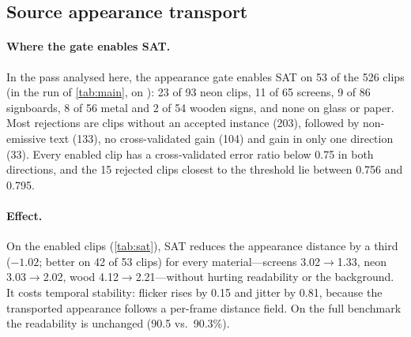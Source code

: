 \subsection{Source appearance transport}
\label{sec:exp_sat}



\paragraph{Where the gate enables SAT.} In the pass analysed here, the appearance gate enables SAT on 53 of the 526 clips (in the run of \cref{tab:main}, on \rSatOn): 23 of 93 neon clips, 11 of 65 screens, 9 of 86 signboards, 8 of 56 metal and 2 of 54 wooden signs, and none on glass or paper. Most rejections are clips without an accepted instance (203), followed by non-emissive text (133), no cross-validated gain (104) and gain in only one direction (33). Every enabled clip has a cross-validated error ratio below 0.75 in both directions, and the 15 rejected clips closest to the threshold lie between 0.756 and 0.795.

\paragraph{Effect.} On the enabled clips (\cref{tab:sat}), SAT reduces the appearance distance by a third ($-1.02$; better on 42 of 53 clips) for every material---screens 3.02$\to$1.33, neon 3.03$\to$2.02, wood 4.12$\to$2.21---without hurting readability or the background. It costs temporal stability: flicker rises by 0.15 and jitter by 0.81, because the transported appearance follows a per-frame distance field. On the full benchmark the readability is unchanged (90.5 vs.\ 90.3\%).


